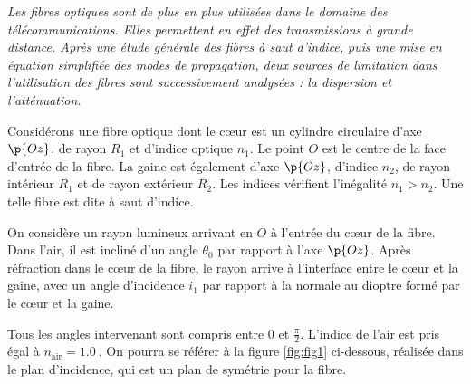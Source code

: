 \documentclass[a4paper,french,bookmarks]{article}
\begin{document}
    \renewcommand{\thesection}{\Roman{section}} 
    \renewcommand{\thesubsection}{\thesection.\Alph{subsection}}
    \renewcommand{\labelenumi}{\thesection.\arabic{enumi}.}
    \renewcommand*{\labelenumii}{\alph{enumii}.}
    \renewcommand*{\labelenumiii}{\alph{enumiii}.}
    
    \newcommand{\ON}{\mathbf{ON}}
    
    
    \emph{Les fibres optiques sont de plus en plus utilisées dans le domaine des télécommunications. Elles permettent en effet des transmissions à grande distance. Après une étude générale des fibres à saut d'indice, puis une mise en équation simplifiée des modes de propagation, deux sources de limitation dans l'utilisation des fibres sont successivement analysées : la dispersion et l'atténuation.}\medskip
    
    Considérons une fibre optique dont le c\oe{}ur est un cylindre circulaire d'axe $\p{Oz}$, de rayon $R_1$ et d'indice optique $n_1$. Le point $O$ est le centre de la face d'entrée de la fibre. La gaine est également d'axe $\p{Oz}$, d'indice $n_2$, de rayon intérieur $R_1$ et de rayon extérieur $R_2$. Les indices vérifient l'inégalité $n_1 > n_2$. Une telle fibre est dite à saut d'indice.\medskip
    
    On considère un rayon lumineux arrivant en $O$ à l'entrée du c\oe{}ur de la fibre. Dans l'air, il est incliné d'un angle $\theta_0$ par rapport à l'axe $\p{Oz}$. Après réfraction dans le c\oe{}ur de la fibre, le rayon arrive à l'interface entre le c\oe{}ur et la gaine, avec un angle d'incidence $i_1$ par rapport à la normale au dioptre formé par le c\oe{}ur et la gaine.\medskip
    
    Tous les angles intervenant sont compris entre $0$ et $\frac{\pi}{2}$. L'indice de l'air est pris égal à $n_\text{air} = \qty{1,0}{}$. On pourra se référer à la figure \ref{fig:fig1} ci-dessous, réalisée dans le plan d'incidence, qui est un plan de symétrie pour la fibre.
    
    \begin{center}
        \begin{minipage}{0.8\linewidth}
            \centering
        \end{minipage}
        \text{}\\[2pt]
        \begin{minipage}{0.9\linewidth}
	        \label{fig:fig1}
        \end{minipage}
    \end{center}
    
\end{document}

